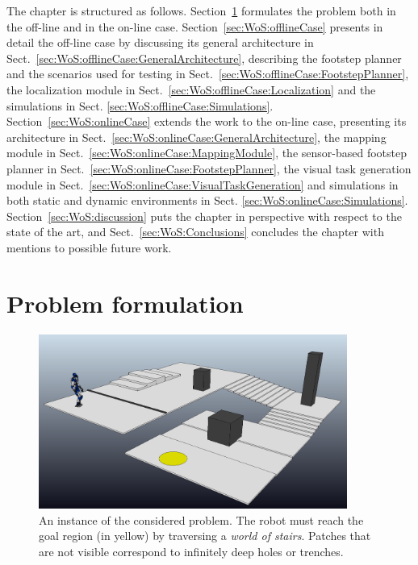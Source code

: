 The chapter is structured as follows. Section~\ref{sec:WoS:Formulation} formulates the problem both in the off-line and in the on-line case. Section~\ref{sec:WoS:offlineCase} presents in detail the off-line case by discussing its general architecture in Sect.~\ref{sec:WoS:offlineCase:GeneralArchitecture}, describing the footstep planner and the scenarios used for testing in Sect.~\ref{sec:WoS:offlineCase:FootstepPlanner}, the localization module in Sect.~\ref{sec:WoS:offlineCase:Localization} and the simulations in Sect. \ref{sec:WoS:offlineCase:Simulations}. Section~\ref{sec:WoS:onlineCase} extends the work to the on-line case, presenting its architecture in Sect.~\ref{sec:WoS:onlineCase:GeneralArchitecture}, the mapping module in Sect.~\ref{sec:WoS:onlineCase:MappingModule}, the sensor-based footstep planner in Sect.~\ref{sec:WoS:onlineCase:FootstepPlanner}, the visual task generation module in Sect.~\ref{sec:WoS:onlineCase:VisualTaskGeneration} and simulations in both static and dynamic environments in Sect. \ref{sec:WoS:onlineCase:Simulations}. Section~\ref{sec:WoS:discussion} puts the chapter in perspective with respect to the state of the art, and Sect.~\ref{sec:WoS:Conclusions} concludes the chapter with mentions to possible future work.

	
\section{Problem formulation}
\label{sec:WoS:Formulation}


\begin{figure}
\centering
\includegraphics[width=0.9\textwidth]{figures/WoS_Scenario.PNG}
\caption{An instance of the considered problem. The robot must reach the goal region (in yellow) by traversing a {\em world of stairs}. Patches that are not visible correspond to infinitely deep holes or trenches.}
\label{fig:WoS:WoSScenario}
\end{figure}

